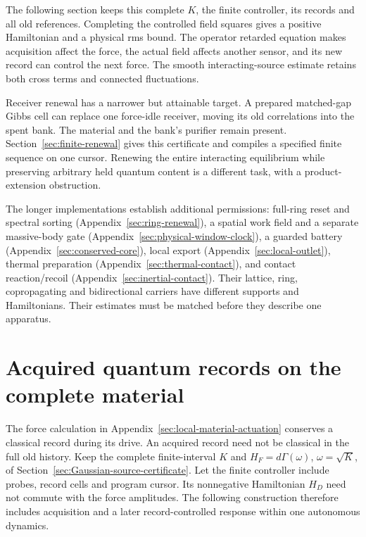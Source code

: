 The following section keeps this complete $K$, the finite controller,
its records and all old references. Completing the controlled field
squares gives a positive Hamiltonian and a physical rms bound.
The operator retarded equation makes acquisition affect the force,
the actual field affects another sensor, and its new record can
control the next force. The smooth interacting-source estimate
retains both cross terms and connected fluctuations.

Receiver renewal has a narrower but attainable target. A prepared
matched-gap Gibbs cell can replace one force-idle receiver, moving
its old correlations into the spent bank. The material and the bank's
purifier remain present. Section~\ref{sec:finite-renewal} gives this
certificate and compiles a specified finite sequence on one cursor.
Renewing the entire interacting equilibrium while preserving arbitrary
held quantum content is a different task, with a product-extension
obstruction.

The longer implementations establish additional permissions:
full-ring reset and spectral sorting
(Appendix~\ref{sec:ring-renewal}), a spatial work field and a separate
massive-body gate (Appendix~\ref{sec:physical-window-clock}),
a guarded battery (Appendix~\ref{sec:conserved-core}), local export
(Appendix~\ref{sec:local-outlet}), thermal preparation
(Appendix~\ref{sec:thermal-contact}), and contact reaction/recoil
(Appendix~\ref{sec:inertial-contact}).
Their lattice, ring, copropagating and bidirectional carriers have
different supports and Hamiltonians. Their estimates must be
matched before they describe one apparatus.

\section{Acquired quantum records on the complete material}
\label{sec:quantum-material-records}

The force calculation in Appendix~\ref{sec:local-material-actuation}
conserves a classical record during its drive. An acquired record need
not be classical in the full old history.
Keep the complete finite-interval $K$ and $H_F=d\Gamma(\omega)$,
$\omega=\sqrt K$, of Section~\ref{sec:Gaussian-source-certificate}.
Let the finite controller include probes, record cells and program cursor.
Its nonnegative Hamiltonian $H_D$ need not commute with the force
amplitudes. The following construction therefore includes acquisition
and a later record-controlled response within one autonomous dynamics.

